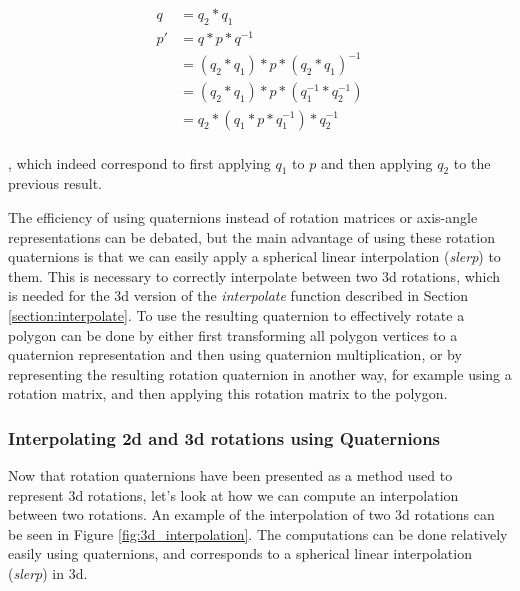 \begin{equation}
\begin{split}
    q   & = q_2*q_1 \\
    p'  & = q*p*q^{-1} \\
        & = (q_2*q_1)*p*(q_2*q_1)^{-1} \\
        & =  (q_2*q_1)*p*(q_1^{-1}*q_2^{-1}) \\
        & = q_2*(q_1*p*q_1^{-1})*q_2^{-1} \\
\end{split}
\end{equation}

, which indeed correspond to first applying \( q_1 \) to \( p \) and then applying \( q_2 \) to the previous result.

The efficiency of using quaternions instead of rotation matrices or axis-angle representations can be debated, but the main advantage of using these rotation quaternions is that we can easily apply a spherical linear interpolation (\textit{slerp}) to them. This is necessary to correctly interpolate between two 3d rotations, which is needed for the 3d version of the \textit{interpolate} function described in Section \ref{section:interpolate}. To use the resulting quaternion to effectively rotate a polygon can be done by either first transforming all polygon vertices to a quaternion representation and then using quaternion multiplication, or by representing the resulting rotation quaternion in another way, for example using a rotation matrix, and then applying this rotation matrix to the polygon.

\subsubsection{Interpolating 2d and 3d rotations using Quaternions}

Now that rotation quaternions have been presented as a method used to represent 3d rotations, let's look at how we can compute an interpolation between two rotations. An example of the interpolation of two 3d rotations can be seen in Figure \ref{fig:3d_interpolation}. The computations can be done relatively easily using quaternions, and corresponds to a spherical linear interpolation (\textit{slerp}) in 3d.

